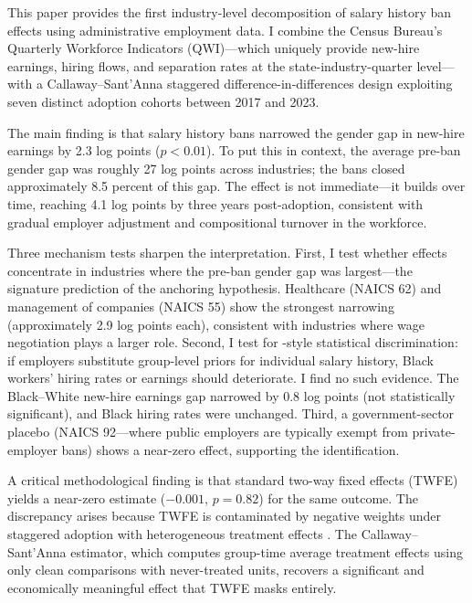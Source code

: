 \documentclass[12pt]{article}
\begin{document}
This paper provides the first industry-level decomposition of salary history ban effects using administrative employment data. I combine the Census Bureau's Quarterly Workforce Indicators (QWI)---which uniquely provide new-hire earnings, hiring flows, and separation rates at the state-industry-quarter level---with a Callaway--Sant'Anna staggered difference-in-differences design exploiting seven distinct adoption cohorts between 2017 and 2023.

The main finding is that salary history bans narrowed the gender gap in new-hire earnings by 2.3 log points ($p < 0.01$). To put this in context, the average pre-ban gender gap was roughly 27 log points across industries; the bans closed approximately 8.5 percent of this gap. The effect is not immediate---it builds over time, reaching 4.1 log points by three years post-adoption, consistent with gradual employer adjustment and compositional turnover in the workforce.

Three mechanism tests sharpen the interpretation. First, I test whether effects concentrate in industries where the pre-ban gender gap was largest---the signature prediction of the anchoring hypothesis. Healthcare (NAICS 62) and management of companies (NAICS 55) show the strongest narrowing (approximately 2.9 log points each), consistent with industries where wage negotiation plays a larger role. Second, I test for \citet{DoleacHansen2020}-style statistical discrimination: if employers substitute group-level priors for individual salary history, Black workers' hiring rates or earnings should deteriorate. I find no such evidence. The Black--White new-hire earnings gap narrowed by 0.8 log points (not statistically significant), and Black hiring rates were unchanged. Third, a government-sector placebo (NAICS 92---where public employers are typically exempt from private-employer bans) shows a near-zero effect, supporting the identification.

A critical methodological finding is that standard two-way fixed effects (TWFE) yields a near-zero estimate ($-0.001$, $p = 0.82$) for the same outcome. The discrepancy arises because TWFE is contaminated by negative weights under staggered adoption with heterogeneous treatment effects \citep{GoodmanBacon2021, deChaisemartinDHaultfoeuille2020}. The Callaway--Sant'Anna estimator, which computes group-time average treatment effects using only clean comparisons with never-treated units, recovers a significant and economically meaningful effect that TWFE masks entirely.
\end{document}
